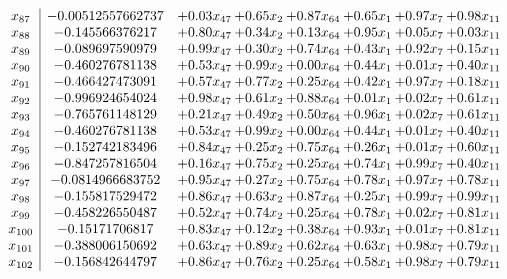 \documentclass[8pt]{article}
\begin{document}
\[\begin{array}{c| c c@{\hskip 2pt} c@{\hskip 2pt} c@{\hskip 2pt} c@{\hskip 2pt} c@{\hskip 2pt} c@{\hskip 2pt} }
 x_{87}   &  -0.00512557662737 & +  0.03 x_{47} & +  0.65 x_{2} & +  0.87 x_{64} & +  0.65 x_{1} & +  0.97 x_{7} & +  0.98 x_{11}\\
 x_{88}   &  -0.145566376217 & +  0.80 x_{47} & +  0.34 x_{2} & +  0.13 x_{64} & +  0.95 x_{1} & +  0.05 x_{7} & +  0.03 x_{11}\\
 x_{89}   &  -0.089697590979 & +  0.99 x_{47} & +  0.30 x_{2} & +  0.74 x_{64} & +  0.43 x_{1} & +  0.92 x_{7} & +  0.15 x_{11}\\
 x_{90}   &  -0.460276781138 & +  0.53 x_{47} & +  0.99 x_{2} & +  0.00 x_{64} & +  0.44 x_{1} & +  0.01 x_{7} & +  0.40 x_{11}\\
 x_{91}   &  -0.466427473091 & +  0.57 x_{47} & +  0.77 x_{2} & +  0.25 x_{64} & +  0.42 x_{1} & +  0.97 x_{7} & +  0.18 x_{11}\\
 x_{92}   &  -0.996924654024 & +  0.98 x_{47} & +  0.61 x_{2} & +  0.88 x_{64} & +  0.01 x_{1} & +  0.02 x_{7} & +  0.61 x_{11}\\
 x_{93}   &  -0.765761148129 & +  0.21 x_{47} & +  0.49 x_{2} & +  0.50 x_{64} & +  0.96 x_{1} & +  0.02 x_{7} & +  0.61 x_{11}\\
 x_{94}   &  -0.460276781138 & +  0.53 x_{47} & +  0.99 x_{2} & +  0.00 x_{64} & +  0.44 x_{1} & +  0.01 x_{7} & +  0.40 x_{11}\\
 x_{95}   &  -0.152742183496 & +  0.84 x_{47} & +  0.25 x_{2} & +  0.75 x_{64} & +  0.26 x_{1} & +  0.01 x_{7} & +  0.60 x_{11}\\
 x_{96}   &  -0.847257816504 & +  0.16 x_{47} & +  0.75 x_{2} & +  0.25 x_{64} & +  0.74 x_{1} & +  0.99 x_{7} & +  0.40 x_{11}\\
 x_{97}   &  -0.0814966683752 & +  0.95 x_{47} & +  0.27 x_{2} & +  0.75 x_{64} & +  0.78 x_{1} & +  0.97 x_{7} & +  0.78 x_{11}\\
 x_{98}   &  -0.155817529472 & +  0.86 x_{47} & +  0.63 x_{2} & +  0.87 x_{64} & +  0.25 x_{1} & +  0.99 x_{7} & +  0.99 x_{11}\\
 x_{99}   &  -0.458226550487 & +  0.52 x_{47} & +  0.74 x_{2} & +  0.25 x_{64} & +  0.78 x_{1} & +  0.02 x_{7} & +  0.81 x_{11}\\
 x_{100}   &  -0.15171706817 & +  0.83 x_{47} & +  0.12 x_{2} & +  0.38 x_{64} & +  0.93 x_{1} & +  0.01 x_{7} & +  0.81 x_{11}\\
 x_{101}   &  -0.388006150692 & +  0.63 x_{47} & +  0.89 x_{2} & +  0.62 x_{64} & +  0.63 x_{1} & +  0.98 x_{7} & +  0.79 x_{11}\\
 x_{102}   &  -0.156842644797 & +  0.86 x_{47} & +  0.76 x_{2} & +  0.25 x_{64} & +  0.58 x_{1} & +  0.98 x_{7} & +  0.79 x_{11}\\

\end{array}\]
\end{document}
